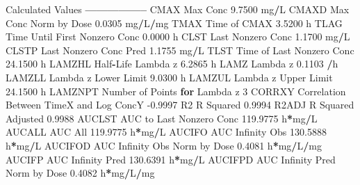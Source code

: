 \documentclass[12pt,]{krantz}
\newenvironment{Shaded}{\begin{snugshade}}{\end{snugshade}}
\newcommand{\ControlFlowTok}[1]{\textcolor[rgb]{0.13,0.29,0.53}{\textbf{#1}}}
\newcommand{\DecValTok}[1]{\textcolor[rgb]{0.00,0.00,0.81}{#1}}
\newcommand{\FloatTok}[1]{\textcolor[rgb]{0.00,0.00,0.81}{#1}}
\newcommand{\NormalTok}[1]{#1}
\newcommand{\OperatorTok}[1]{\textcolor[rgb]{0.81,0.36,0.00}{\textbf{#1}}}
\begin{document}
\begin{Shaded}
\begin{Highlighting}[]
{{{{{{{{{{{{{{{{{{{{{{{{{{{{{{{{\NormalTok{Calculated Values}
\OperatorTok{-----------------}
\NormalTok{CMAX       Max Conc                                        }\FloatTok{9.7500}\NormalTok{ mg}\OperatorTok{/}\NormalTok{L}
\NormalTok{CMAXD      Max Conc Norm by Dose                           }\FloatTok{0.0305}\NormalTok{ mg}\OperatorTok{/}\NormalTok{L}\OperatorTok{/}\NormalTok{mg}
\NormalTok{TMAX       Time of CMAX                                    }\FloatTok{3.5200}\NormalTok{ h}
\NormalTok{TLAG       Time Until First Nonzero Conc                   }\FloatTok{0.0000}\NormalTok{ h}
\NormalTok{CLST       Last Nonzero Conc                               }\FloatTok{1.1700}\NormalTok{ mg}\OperatorTok{/}\NormalTok{L}
\NormalTok{CLSTP      Last Nonzero Conc Pred                          }\FloatTok{1.1755}\NormalTok{ mg}\OperatorTok{/}\NormalTok{L}
\NormalTok{TLST       Time of Last Nonzero Conc                      }\FloatTok{24.1500}\NormalTok{ h}
\NormalTok{LAMZHL     Half}\OperatorTok{-}\NormalTok{Life Lambda z                              }\FloatTok{6.2865}\NormalTok{ h}
\NormalTok{LAMZ       Lambda z                                        }\FloatTok{0.1103} \OperatorTok{/}\NormalTok{h}
\NormalTok{LAMZLL     Lambda z Lower Limit                            }\FloatTok{9.0300}\NormalTok{ h}
\NormalTok{LAMZUL     Lambda z Upper Limit                           }\FloatTok{24.1500}\NormalTok{ h}
\NormalTok{LAMZNPT    Number of Points }\ControlFlowTok{for}\NormalTok{ Lambda z                   }\DecValTok{3}
\NormalTok{CORRXY     Correlation Between TimeX and Log ConcY        }\FloatTok{-0.9997} 
\NormalTok{R2         R Squared                                       }\FloatTok{0.9994} 
\NormalTok{R2ADJ      R Squared Adjusted                              }\FloatTok{0.9988} 
\NormalTok{AUCLST     AUC to Last Nonzero Conc                      }\FloatTok{119.9775}\NormalTok{ h}\OperatorTok{*}\NormalTok{mg}\OperatorTok{/}\NormalTok{L}
\NormalTok{AUCALL     AUC All                                       }\FloatTok{119.9775}\NormalTok{ h}\OperatorTok{*}\NormalTok{mg}\OperatorTok{/}\NormalTok{L}
\NormalTok{AUCIFO     AUC Infinity Obs                              }\FloatTok{130.5888}\NormalTok{ h}\OperatorTok{*}\NormalTok{mg}\OperatorTok{/}\NormalTok{L}
\NormalTok{AUCIFOD    AUC Infinity Obs Norm by Dose                   }\FloatTok{0.4081}\NormalTok{ h}\OperatorTok{*}\NormalTok{mg}\OperatorTok{/}\NormalTok{L}\OperatorTok{/}\NormalTok{mg}
\NormalTok{AUCIFP     AUC Infinity Pred                             }\FloatTok{130.6391}\NormalTok{ h}\OperatorTok{*}\NormalTok{mg}\OperatorTok{/}\NormalTok{L}
\NormalTok{AUCIFPD    AUC Infinity Pred Norm by Dose                  }\FloatTok{0.4082}\NormalTok{ h}\OperatorTok{*}\NormalTok{mg}\OperatorTok{/}\NormalTok{L}\OperatorTok{/}\NormalTok{mg}
}}}}}}}}}}}}}}}}}}}}}}}}}}}}}}}}
\end{Highlighting}
\end{Shaded}
\end{document}
